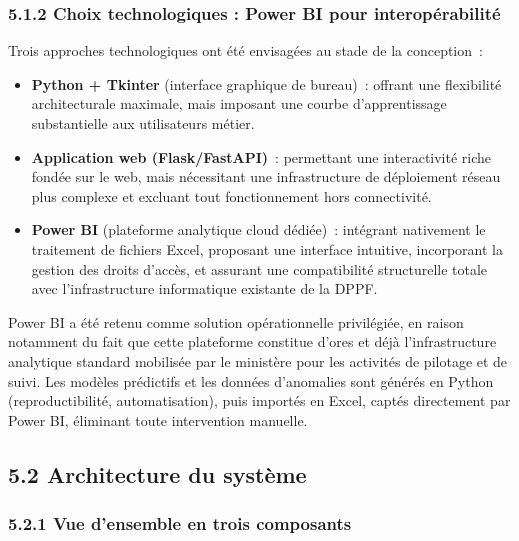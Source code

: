 \subsubsection*{5.1.2 \quad Choix technologiques : Power BI pour interop\'erabilit\'e}

Trois approches technologiques ont \'et\'e envisag\'ees au stade de la conception~:

\begin{itemize}
    \item \textbf{Python + Tkinter} (interface graphique de bureau)~: offrant une
    flexibilit\'e architecturale maximale, mais imposant une courbe d'apprentissage
    substantielle aux utilisateurs m\'etier.
    \item \textbf{Application web (Flask/FastAPI)}~: permettant une interactivit\'e
    riche fond\'ee sur le web, mais n\'ecessitant une infrastructure de d\'eploiement
    r\'eseau plus complexe et excluant tout fonctionnement hors connectivit\'e.
    \item \textbf{Power BI} (plateforme analytique cloud d\'edi\'ee)~: int\'egrant
    nativement le traitement de fichiers Excel, proposant une interface intuitive,
    incorporant la gestion des droits d'acc\`es, et assurant une compatibilit\'e
    structurelle totale avec l'infrastructure informatique existante de la DPPF.
\end{itemize}

Power BI a \'et\'e retenu comme solution op\'erationnelle privil\'egi\'ee, en raison
notamment du fait que cette plateforme constitue d'ores et d\'ej\`a l'infrastructure
analytique standard mobilis\'ee par le minist\`ere pour les activit\'es de pilotage et
de suivi. Les mod\`eles pr\'edictifs et les donn\'ees d'anomalies sont 
g\'en\'er\'es en Python (reproductibilit\'e, automatisation), puis import\'es en
Excel, capt\'es directement par Power BI, \'eliminant toute intervention manuelle.

\subsection*{5.2 \quad Architecture du syst\`eme}

\subsubsection*{5.2.1 \quad Vue d'ensemble en trois composants}


